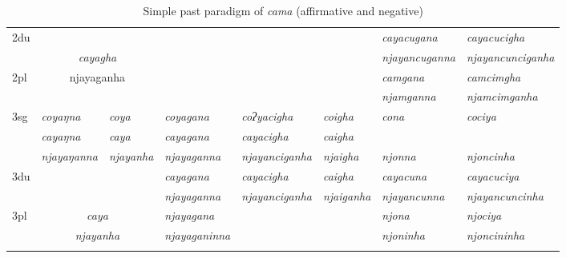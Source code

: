 \begin{sidewaystable}[p]
{\begin{tabular}{|l||p{2.4cm}|p{1.5cm}|p{2.4cm}|p{2.4cm}|p{2.4cm}|p{3.2cm}|p{3.2cm}|}
 \cline{1-2} \cline{7-8}			
{\sc 2du}		& \multicolumn{2}{c|}{}     & \multicolumn{3}{c|}{\cellcolor[gray]{.8}} & \it  cayacugana  & \it   cayacucigha \\
		& \multicolumn{2}{c|}{\it cayagha} & \multicolumn{3}{c|}{ \cellcolor[gray]{.8}}& \it njayancuganna  & \it  njayancunciganha \\
 \cline{1-1} \cline{7-8}			
{\sc 2pl}	& \multicolumn{2}{c|}{njayaganha} & \multicolumn{3}{c|}{\cellcolor[gray]{.8} }& \it  camgana& \it  camcimgha  \\
		& 	\multicolumn{2}{c|}{ }& \multicolumn{3}{c|}{\cellcolor[gray]{.8} }& \it  njamganna & \it  njamcimganha \\
\hline			
{\sc 3sg}	& \it coyaŋna	\ti  & \it 	 coya   \ti  	& \it   	coyagana		\ti & \it   coʔyacigha \ti  & \it   coigha \ti 	& \it cona & \it cociya \\
					& \it cayaŋna	  & \it 	      caya	& \it  cayagana 			& \it  cayacigha   & \it   caigha	& \it  & \it  \\
					& \it  njayaŋanna   & \it   njayanha 	& \it  njayaganna& \it  njayanciganha & \it  njaigha  & \it njonna& \it njoncinha\\
\hline
{\sc 3du }		&  \multicolumn{2}{c|}{}& \it cayagana& \it cayacigha & \it    caigha& \it   cayacuna & \it   cayacuciya\\
		& \multicolumn{2}{c|}{}& \it   	njayaganna	& \it njayanciganha	& \it  njaiganha& \it  njayancunna & \it njayancuncinha \\
 \cline{1-1} \cline{4-4} \cline{7-8}	
{\sc 3pl}		& \multicolumn{2}{c|}{\it caya}& \it njayagana& \it & \it  & \it njona& \it njociya\\	
	& \multicolumn{2}{c|}{\it  njayanha}			& \it njayaganinna& \it  & \it  & \it njoninha& \it njoncininha \\
\lspbottomrule
\end{tabular}
}

\caption{Simple past  paradigm of \emph{cama}  (affirmative and negative)}\label{par-cama-pst}
\end{sidewaystable}


